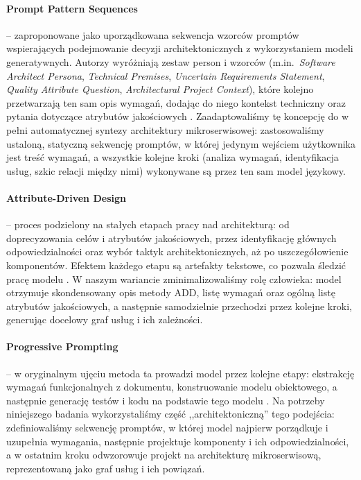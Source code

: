 \paragraph{Prompt Pattern Sequences} -- zaproponowane jako uporządkowana sekwencja wzorców promptów wspierających podejmowanie decyzji architektonicznych z wykorzystaniem modeli generatywnych. Autorzy wyróżniają zestaw person i wzorców (m.in.\ \emph{Software Architect Persona}, \emph{Technical Premises}, \emph{Uncertain Requirements Statement}, \emph{Quality Attribute Question}, \emph{Architectural Project Context}), które kolejno przetwarzają ten sam opis wymagań, dodając do niego kontekst techniczny oraz pytania dotyczące atrybutów jakościowych \cite{maranhao}. Zaadaptowaliśmy tę koncepcję do w pełni automatycznej syntezy architektury mikroserwisowej: zastosowaliśmy ustaloną, statyczną sekwencję promptów, w której jedynym wejściem użytkownika jest treść wymagań, a wszystkie kolejne kroki (analiza wymagań, identyfikacja usług, szkic relacji między nimi) wykonywane są przez ten sam model językowy.

\paragraph{Attribute-Driven Design} -- proces podzielony na stałych etapach pracy nad architekturą: od doprecyzowania celów i atrybutów jakościowych, przez identyfikację głównych odpowiedzialności oraz wybór taktyk architektonicznych, aż po uszczegółowienie komponentów. Efektem każdego etapu są artefakty tekstowe, co pozwala śledzić pracę modelu \cite{add}. W naszym wariancie zminimalizowaliśmy rolę człowieka: model otrzymuje skondensowany opis metody ADD, listę wymagań oraz ogólną listę atrybutów jakościowych, a następnie samodzielnie przechodzi przez kolejne kroki, generując docelowy graf usług i ich zależności.

\paragraph{Progressive Prompting} -- w oryginalnym ujęciu metoda ta prowadzi model przez kolejne etapy: ekstrakcję wymagań funkcjonalnych z dokumentu, konstruowanie modelu obiektowego, a następnie generację testów i kodu na podstawie tego modelu \cite{wei}. Na potrzeby niniejszego badania wykorzystaliśmy część ,,architektoniczną'' tego podejścia: zdefiniowaliśmy sekwencję promptów, w której model najpierw porządkuje i uzupełnia wymagania, następnie projektuje komponenty i ich odpowiedzialności, a w ostatnim kroku odwzorowuje projekt na architekturę mikroserwisową, reprezentowaną jako graf usług i ich powiązań.

